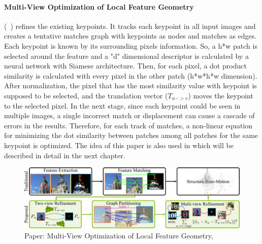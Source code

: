 \documentclass[11pt]{article}
\begin{document}
    \paragraph{Multi-View Optimization of Local Feature Geometry} (~\cite{Dusmanu2020Multi}) refines the existing keypoints. It tracks each keypoint in all input images and creates a tentative
    matches graph with keypoints as nodes and matches as edges. Each keypoint is known by its surrounding pixels
    information. So, a h*w patch is selected around the feature and a "d" dimensional descriptor is calculated by
    a neural network with Siamese architecture. Then, for each pixel, a dot product similarity is calculated
    with every pixel in the other patch (h*w*h*w dimension). After normalization, the pixel that has the most
    similarity value with keypoint is supposed to be selected, and the translation vector ($T_{u->v}$)
    moves the keypoint to the selected pixel. In the next stage, since each keypoint could be seen in multiple images,
    a single incorrect match or displacement can cause a cascade of errors in the results. Therefore, for each track of
    matches, a non-linear equation for minimizing the dot similarity between patches among all patches for the same
    keypoint is optimized. The idea of this paper is also used in \cite{lindenberger2021pixsfm} which will be
    described in detail in the next chapter.

    \begin{figure}
    \centering
    \includegraphics[width=\textwidth,height=\textheight,keepaspectratio]{images/dusmano.jpg}
    \caption{Paper: Multi-View Optimization of Local Feature Geometry, \cite{Dusmanu2020Multi}}
    \end{figure}
\end{document}
